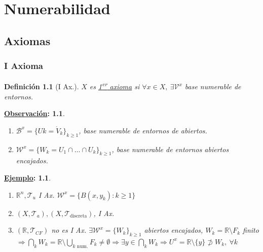 \documentclass[10pt,a4paper,openright]{book}
\theoremstyle{break}
\newtheorem*{defi}{Definición}
\newtheorem*{obs}{\underline{Observación}:}
\newtheorem*{ej}{\underline{Ejemplo}:}
\begin{document}
\chapter{Numerabilidad}%
\label{cha:numerabilidad}

\section{Axiomas}%
\label{sec:axiomas}
\subsection{I Axioma}%
\label{sub:i_axioma}

\begin{defi}[I Ax.]
$X$ es \underline{1\textsuperscript{er} axioma} si $\forall x \in X,\ \exists \mathcal{V}^x$ base numerable de entornos.  
\end{defi}

\begin{obs}
\begin{enumerate}
    \item $\mathcal{B}^x = \{Uk = \mathring{V}_k \}_{k \ge 1}$, base numerable de entornos de abiertos.
    \item $\mathcal{W}^x = \{W_k = U_1 \cap \ldots \cap U_k\}_{k \ge 1}$, base numerable de entornos abiertos encajados.
\end{enumerate}
\end{obs}

\begin{ej}
\begin{enumerate}
    \item $\mathbb{R}^n, \mathcal{T}_u$ I Ax. $\mathcal{W}^x = \{B\left( x, y_k \right): k \ge 1\}$ 
    \item $\left( X, \mathcal{T}_a \right), \left( X, \mathcal{T}_{\text{discreta}} \right)$, I Ax.
    \item $\left( \mathbb{R}, \mathcal{T}_{CF} \right)$ no es I Ax. $\exists \mathcal{W}^x = \{W_k\}_{k \ge 1}$ abiertos encajados, $W_k = \mathbb{R} \setminus F_k$ finito $\Rightarrow \bigcap_{k} W_k = \mathbb{R} \setminus \bigcup_{k \text{ num.}} F_k \neq \emptyset \Rightarrow \exists y \in \bigcap_{k} W_k \Rightarrow U^x = \mathbb{R}\setminus \{y\} \not \supset W_k,\ \forall k$ 
\end{enumerate}
\end{ej}
\end{document}
